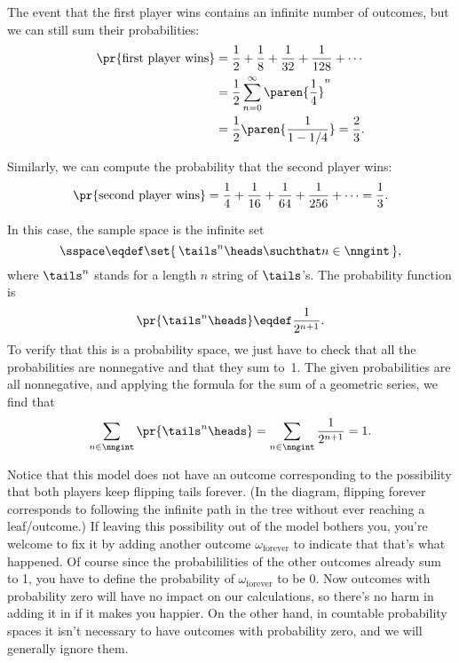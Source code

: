 The event that the first player wins contains an infinite number of
outcomes, but we can still sum their probabilities:
\begin{align*}
\pr{\text{first player wins}}
    & = \frac{1}{2} + \frac{1}{8} + \frac{1}{32} + \frac{1}{128} + \cdots \\
    & = \frac{1}{2} \sum_{n=0}^\infty \paren{\frac{1}{4}}^n \\
    & = \frac{1}{2}\paren{\frac{1}{1-1/4}} = \frac{2}{3}.
\end{align*}

Similarly, we can compute the probability that the second player wins:
\begin{align*}
\pr{\text{second player wins}}
     = \frac{1}{4} + \frac{1}{16} + \frac{1}{64} + \frac{1}{256}
                      + \cdots %
     = \frac{1}{3}.
\end{align*}

In this case, the sample space is the infinite set
\[
    \sspace \eqdef \set{\, \tails^n\heads \suchthat n \in \nngint \,},
\]
where $\tails^n$ stands for a length $n$ string of $\tails$'s.
The probability function is
\[
\pr{\tails^n\heads} \eqdef \frac{1}{2^{n+1}}.
\]
To verify that this is a probability space, we just have to check that
all the probabilities are nonnegative and that they sum to~1.  The
given probabilities are all nonnegative, and applying the formula for
the sum of a geometric series, we find that
\begin{equation*}
\sum_{n \in \nngint} \pr{\tails^n\heads}
    = \sum_{n \in \nngint} \frac{1}{2^{n+1}} \\
    = 1.
\end{equation*}

Notice that this model does not have an outcome corresponding to the
possibility that both players keep flipping tails forever.  (In the
diagram, flipping forever corresponds to following the infinite path
in the tree without ever reaching a leaf/outcome.)  If leaving this
possibility out of the model bothers you, you're welcome to fix it by
adding another outcome $\omega_{\text{forever}}$ to indicate that
that's what happened.  Of course since the probabililities of the
other outcomes already sum to 1, you have to define the probability of
$\omega_{\text{forever}}$ to be 0.  Now outcomes with probability zero
will have no impact on our calculations, so there's no harm in adding
it in if it makes you happier.  On the other hand, in countable
probability spaces it isn't necessary to have outcomes with
probability zero, and we will generally ignore them.

